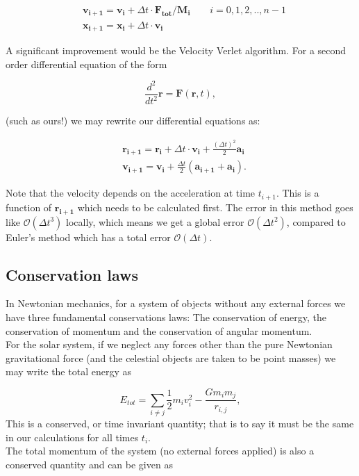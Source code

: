 \documentclass[%
 reprint,
 nobalance,
 amsmath,amssymb,
 aps,
]{revtex4-1}
\begin{document}
\begin{equation}
\begin{split}
	& \bm{v_{i+1} = v_i} + \Delta t \cdot \bm{F_{tot}/M_i} \qquad i=0,1,2,..,{n-1} \\
	& \bm{x_{i+1} = x_{i}} + \Delta t \cdot \bm{v_i}
\end{split}
\end{equation}

A significant improvement would be the Velocity Verlet algorithm. For a second order differential equation of the form

\begin{equation}
	\frac{d^{2}}{dt^{2}}\bm{r} = \bm{F}(\bm{r}, t),
\end{equation}

(such as ours!) we may rewrite our differential equations as:

\begin{equation}
\begin{split}
	&\bm{r_{i+1} = r_i} + \Delta t \cdot \bm{v_i} + \frac{(\Delta t)^{2}}{2} \bm{a_i} \\
	& \bm{v_{i+1} = v_i} + \frac{\Delta t}{2}(\bm{a_{i+1} + a_i}).
\end{split}
\end{equation}

Note that the velocity depends on the acceleration at time $t_{i+1}$. This is a function of $\bm{r_{i+1}}$ which needs to be calculated first. The error in this method goes like $\mathcal{O}(\Delta t^{3})$ locally, which means we get a global error $\mathcal{O}(\Delta t^{2})$, compared to Euler's method which has a total error $\mathcal{O}(\Delta t)$.

\subsection{\label{sec:Con}Conservation laws}
In Newtonian mechanics, for a system of objects without any external forces we have three fundamental conservations laws: The conservation of energy, the conservation of momentum and the conservation of angular momentum. \\
For the solar system, if we neglect any forces other than the pure Newtonian gravitational force (and the celestial objects are taken to be point masses) we may write the total energy as

\begin{equation}\label{eq:10}
	E_{tot} = \sum_{i \neq j}{\frac{1}{2}m_i v_{i}^{2} - \frac{Gm_i m_j}{r_{i,j}}},
\end{equation}
This is a conserved, or time invariant quantity; that is to say it must be the same in our calculations for all times $t_i$.\\
The total momentum of the system (no external forces applied) is also a conserved quantity and can be given as
\end{document}
